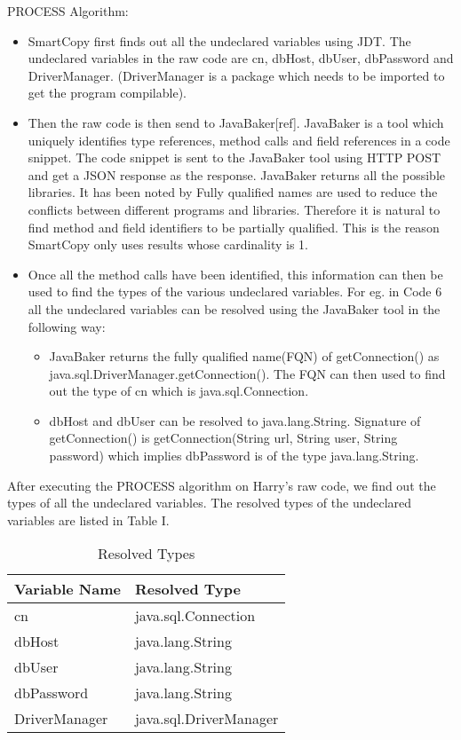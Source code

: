 PROCESS Algorithm:
\begin{itemize}
\item SmartCopy first finds out all the undeclared variables using JDT. 
The undeclared variables in the raw code are cn, dbHost, dbUser, dbPassword and DriverManager. 
(DriverManager is a package which needs to be imported to get the program compilable).
\item Then the raw code is then send to JavaBaker[ref].
JavaBaker is a tool which uniquely identifies type references, method calls and field references in a code snippet. 
The code snippet is sent to the JavaBaker tool using HTTP POST and get a JSON response as the response.  
JavaBaker returns all the possible libraries.
It has been noted by Fully qualified names are used to reduce the conflicts between different programs and libraries.
Therefore it is natural to find method and field identifiers to be partially qualified. 
This is the reason SmartCopy only uses results whose cardinality is 1. 
\item Once all the method calls have been identified, this information can then be used to find the types of the various undeclared variables.
For eg. in Code 6 all the undeclared variables can be resolved using the JavaBaker tool in the following way:
\begin{itemize}
\item JavaBaker returns the fully qualified name(FQN) of getConnection() as java.sql.DriverManager.getConnection(). The FQN can then used to find out the type of cn which is java.sql.Connection. 
\item dbHost and dbUser can be resolved to java.lang.String. Signature of getConnection() is getConnection(String url, String user, String password) which implies dbPassword is of the type java.lang.String. 
\end{itemize}
\end{itemize}

After executing the PROCESS algorithm on Harry\rq s raw code, we find out the types of all the undeclared variables. The resolved types of the undeclared variables are listed in Table I.

\begin{table}[!htbp]
\normalsize
    \centering
    \begin{tabular}{|l|l|}
    \hline
    Variable Name & Resolved Type \\ \hline
    cn & java.sql.Connection \\ \hline
    dbHost & java.lang.String \\ \hline
    dbUser & java.lang.String \\ \hline
    dbPassword & java.lang.String \\ \hline
    DriverManager & java.sql.DriverManager \\ \hline
    \end{tabular}
        \caption{Resolved Types}
\end{table}

